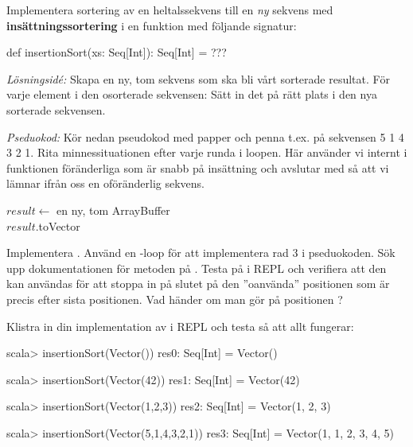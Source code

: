 \Task Implementera sortering av en heltalssekvens till en \emph{ny} sekvens med \textbf{insättningssortering}  i en funktion med följande signatur:
\begin{Code}
def insertionSort(xs: Seq[Int]): Seq[Int] = ??? 
\end{Code}

\emph{Lösningsidé:} Skapa en ny, tom sekvens som ska bli vårt sorterade resultat. För varje element i den osorterade sekvensen: Sätt in det på rätt plats i den nya sorterade sekvensen.   

\Subtask \emph{Pseduokod:} Kör nedan pseudokod med papper och penna t.ex. på sekvensen 5 1 4 3 2 1. Rita minnessituationen efter varje runda i loopen. Här använder vi internt i funktionen föränderliga  som är snabb på insättning och avslutar med  så att vi lämnar ifrån oss en oföränderlig sekvens.

\begin{algorithm}[H]
    $result \leftarrow$ en ny, tom ArrayBuffer \\
    $result$.toVector
\end{algorithm}


\Subtask Implementera . Använd en -loop för att implementera rad 3 i pseduokoden. Sök upp dokumentationen för metoden  på . Testa   på  i REPL och verifiera att den kan användas för att stoppa in på slutet på den ''oanvända'' positionen som är precis efter sista positionen. Vad händer om man gör  på positionen ? 

Klistra in din implementation av  i REPL och testa så att allt fungerar:
\begin{REPL}
scala> insertionSort(Vector())
res0: Seq[Int] = Vector()

scala> insertionSort(Vector(42))
res1: Seq[Int] = Vector(42)

scala> insertionSort(Vector(1,2,3))
res2: Seq[Int] = Vector(1, 2, 3)

scala> insertionSort(Vector(5,1,4,3,2,1))
res3: Seq[Int] = Vector(1, 1, 2, 3, 4, 5)
\end{REPL}






